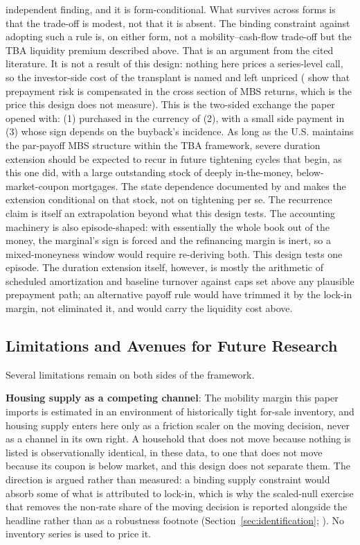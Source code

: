 \documentclass[12pt]{article}
\begin{document}
independent finding, and it is form-conditional. What survives across forms is that the trade-off is modest, not that it is absent. The binding constraint against adopting such a rule is, on either form, not a mobility--cash-flow trade-off but the TBA liquidity premium described above. That is an argument from the cited literature. It is not a result of this design: nothing here prices a series-level call, so the investor-side cost of the transplant is named and left unpriced (\citet{diep2021} show that prepayment risk is compensated in the cross section of MBS returns, which is the price this design does not measure). This is the two-sided exchange the paper opened with: (1) purchased in the currency of (2), with a small side payment in (3) whose sign depends on the buyback's incidence. As long as the U.S. maintains the par-payoff MBS structure within the TBA framework, severe duration extension should be expected to recur in future tightening cycles that begin, as this one did, with a large outstanding stock of deeply in-the-money, below-market-coupon mortgages. The state dependence documented by \citet{berger2021} and \citet{eichenbaum2022} makes the extension conditional on that stock, not on tightening per se. The recurrence claim is itself an extrapolation beyond what this design tests. The accounting machinery is also episode-shaped: with essentially the whole book out of the money, the marginal's sign is forced and the refinancing margin is inert, so a mixed-moneyness window would require re-deriving both. This design tests one episode. The duration extension itself, however, is mostly the arithmetic of scheduled amortization and baseline turnover against caps set above any plausible prepayment path; an alternative payoff rule would have trimmed it by the lock-in margin, not eliminated it, and would carry the liquidity cost above.

\subsection{Limitations and Avenues for Future Research}\label{sec:limitations}

Several limitations remain on both sides of the framework.

\textbf{Housing supply as a competing channel}: The mobility margin this paper imports is estimated in an environment of historically tight for-sale inventory, and housing supply enters here only as a friction scaler on the moving decision, never as a channel in its own right. A household that does not move because nothing is listed is observationally identical, in these data, to one that does not move because its coupon is below market, and this design does not separate them. The direction is argued rather than measured: a binding supply constraint would absorb some of what is attributed to lock-in, which is why the scaled-null exercise that removes the non-rate share of the moving decision is reported alongside the headline rather than as a robustness footnote (Section~\ref{sec:identification}; \citealp{aladangady2024,hsieh2019}). No inventory series is used to price it.
\end{document}

